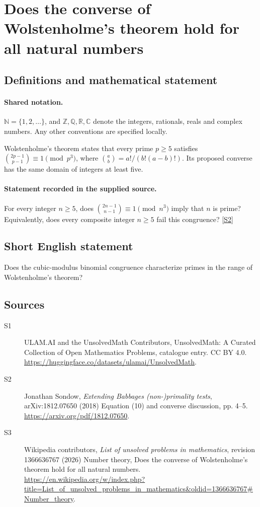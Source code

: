 \documentclass[11pt]{article}
\newcommand{\sref}[2]{\hyperlink{source:#1:#2}{[S#2]}}
\begin{document}
\section{Does the converse of Wolstenholme's theorem hold for all natural numbers}\label{statement}

\subsection{Definitions and mathematical statement}

\paragraph{Shared notation.}$\mathbb N=\{1,2,\ldots\}$, and $\mathbb Z,\mathbb Q,\mathbb R,\mathbb C$ denote the integers, rationals, reals and complex numbers. Any other conventions are specified locally.


Wolstenholme's theorem states that every prime $p\ge5$ satisfies $\binom{2p-1}{p-1}\equiv1\pmod{p^3}$, where $\binom ab=a!/(b!(a-b)!)$. Its proposed converse has the same domain of integers at least five.
\paragraph{Statement recorded in the supplied source.}
For every integer $n\ge5$, does $\binom{2n-1}{n-1}\equiv1\pmod{n^3}$ imply that $n$ is prime? Equivalently, does every composite integer $n\ge5$ fail this congruence? \sref{statement}{2}
\subsection{Short English statement}
Does the cubic-modulus binomial congruence characterize primes in the range of Wolstenholme’s theorem?
\subsection{Sources}
\begin{description}
\item[\hypertarget{source:statement:1}{S1}] ULAM.AI and the UnsolvedMath Contributors, UnsolvedMath: A Curated Collection of Open Mathematics Problems, catalogue entry. CC BY 4.0. \url{https://huggingface.co/datasets/ulamai/UnsolvedMath}.
\item[\hypertarget{source:statement:2}{S2}] Jonathan Sondow, \emph{Extending Babbage\textquotesingle s (non-)primality tests}, arXiv:1812.07650 (2018) Equation (10) and converse discussion, pp. 4--5. \url{https://arxiv.org/pdf/1812.07650}.
\item[\hypertarget{source:statement:3}{S3}] Wikipedia contributors, \emph{List of unsolved problems in mathematics}, revision 1366636767 (2026) Number theory, Does the converse of Wolstenholme's theorem hold for all natural numbers. \url{https://en.wikipedia.org/w/index.php?title=List_of_unsolved_problems_in_mathematics&oldid=1366636767#Number_theory}.
\end{description}
\label{end:statement}
\end{document}
